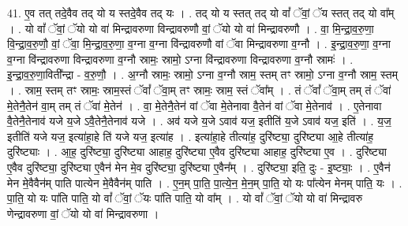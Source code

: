 \documentclass[17pt]{extarticle}
\begin{document}
41. ए॒व तत् तदे॒वैव तद् यो य स्तदे॒वैव तद् यः । . तद् यो य स्तत् तद् यो वां᳚ ॅवां॒ ॅय स्तत् तद् यो वा᳚म् । . यो वां᳚ ॅवां॒ ॅयो यो वा॑ मिन्द्रावरुणा विन्द्रावरुणौ वां॒ ॅयो यो वा॑ मिन्द्रावरुणौ । . वा॒ मि॒न्द्रा॒व॒रु॒णा॒ वि॒न्द्रा॒व॒रु॒णौ॒ वां॒ ॅवा॒ मि॒न्द्रा॒व॒रु॒णा॒ व॒ग्ना व॒ग्ना वि॑न्द्रावरुणौ वां ॅवा मिन्द्रावरुणा व॒ग्नौ । . इ॒न्द्रा॒व॒रु॒णा॒ व॒ग्ना व॒ग्ना वि॑न्द्रावरुणा विन्द्रावरुणा व॒ग्नौ स्रामः॒ स्रामो॒ ऽग्ना वि॑न्द्रावरुणा विन्द्रावरुणा व॒ग्नौ स्रामः॑ । . इ॒न्द्रा॒व॒रु॒णा॒विती᳚न्द्रा - व॒रु॒णौ॒ । . अ॒ग्नौ स्रामः॒ स्रामो॒ ऽग्ना व॒ग्नौ स्राम॒ स्तम् तꣳ स्रामो॒ ऽग्ना व॒ग्नौ स्राम॒ स्तम् । . स्राम॒ स्तम् तꣳ स्रामः॒ स्राम॒स्तं ॅवां᳚ ॅवा॒म् तꣳ स्रामः॒ स्राम॒ स्तं ॅवा᳚म् । . तं ॅवां᳚ ॅवा॒म् तम् तं ॅवा॑ मे॒तेनै॒तेन॑ वा॒म् तम् तं ॅवा॑ मे॒तेन॑ । . वा॒ मे॒तेनै॒तेन॑ वां ॅवा मे॒तेनावा वै॒तेन॑ वां ॅवा मे॒तेनाव॑ । . ए॒तेनावा वै॒तेनै॒तेनाव॑ यजे य॒जे ऽवै॒तेनै॒तेनाव॑ यजे । . अव॑ यजे य॒जे ऽवाव॑ यज॒ इतीति॑ य॒जे ऽवाव॑ यज॒ इति॑ । . य॒ज॒ इतीति॑ यजे यज॒ इत्या॑हा॒हे ति॑ यजे यज॒ इत्या॑ह । . इत्या॑हा॒हे तीत्या॑ह॒ दुरि॑ष्ट्या॒ दुरि॑ष्ट्या आ॒हे तीत्या॑ह॒ दुरि॑ष्ट्याः । . आ॒ह॒ दुरि॑ष्ट्या॒ दुरि॑ष्ट्या आहाह॒ दुरि॑ष्ट्या ए॒वैव दुरि॑ष्ट्या आहाह॒ दुरि॑ष्ट्या ए॒व । . दुरि॑ष्ट्या ए॒वैव दुरि॑ष्ट्या॒ दुरि॑ष्ट्या ए॒वैन॑ मेन मे॒व दुरि॑ष्ट्या॒ दुरि॑ष्ट्या ए॒वैन᳚म् । . दुरि॑ष्ट्या॒ इति॒ दुः - इ॒ष्ट्याः॒ । . ए॒वैन॑ मेन मे॒वैवैन॑म् पाति पात्येन मे॒वैवैन॑म् पाति । . ए॒न॒म् पा॒ति॒ पा॒त्ये॒न॒ मे॒न॒म् पा॒ति॒ यो यः पा᳚त्येन मेनम् पाति॒ यः । . पा॒ति॒ यो यः पा॑ति पाति॒ यो वां᳚ ॅवां॒ ॅयः पा॑ति पाति॒ यो वा᳚म् । . यो वां᳚ ॅवां॒ ॅयो यो वा॑ मिन्द्रावरु णेन्द्रावरुणा वां॒ ॅयो यो वा॑ मिन्द्रावरुणा । \newline
\end{document}
